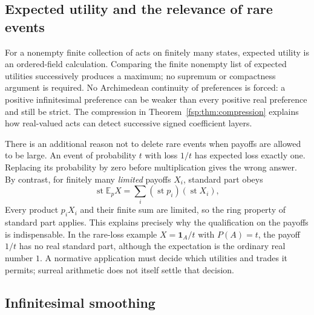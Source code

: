 \documentclass[11pt,a4paper]{article}
\numberwithin{equation}{section}
\theoremstyle{definition}
\theoremstyle{remark}
\newcommand{\E}{\mathbb E}
\newcommand{\st}{\operatorname{st}}
\newcommand{\ind}{\mathbf 1}
\begin{document}
\subsection{Expected utility and the relevance of rare events}

For a nonempty finite collection of acts on finitely many states, expected
utility is an ordered-field calculation. Comparing the finite nonempty
list of expected utilities successively produces a maximum; no supremum
or compactness argument is required.
No Archimedean continuity of preferences is forced: a positive
infinitesimal preference can be weaker than every positive real
preference and still be strict. The compression in
Theorem~\ref{fsp:thm:compression} explains how real-valued acts can detect
successive signed coefficient layers.

There is an additional reason not to delete rare events when payoffs
are allowed to be large. An event of probability $t$ with loss $1/t$
has expected loss exactly one. Replacing its probability by zero before
multiplication gives the wrong answer. By contrast, for finitely many
\emph{limited} payoffs $X_i$, standard part obeys
\begin{equation}
 \st\E_pX=\sum_i(\st p_i)(\st X_i),
\end{equation}
Every product $p_iX_i$ and their finite sum are limited, so the ring
property of standard part applies. This explains precisely why the
qualification on the payoffs is indispensable. In the rare-loss example
$X=\ind_A/t$ with $P(A)=t$, the payoff $1/t$ has no real standard part,
although the expectation is the ordinary real number $1$.
A normative application must decide which utilities and trades it permits;
surreal arithmetic does not itself settle that decision.

\subsection{Infinitesimal smoothing}
\end{document}
